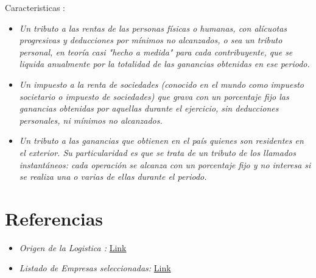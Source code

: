 \documentclass[
10pt, %
a4paper, %
oneside, %
headinclude,footinclude, %
BCOR5mm, %
]{scrartcl}
\begin{document}
Caracteristicas :
\begin{itemize}
  \item \emph{Un tributo a las rentas de las personas físicas o humanas, con
              alícuotas progresivas y deducciones por mínimos no alcanzados,
              o sea un tributo personal, en teoría casi "hecho a medida" para
              cada contribuyente, que se liquida anualmente por la totalidad
              de las ganancias obtenidas en ese periodo.}
  \item \emph{Un impuesto a la renta de sociedades (conocido en el mundo como
              impuesto societario o impuesto de sociedades) que grava con un
              porcentaje fijo las ganancias obtenidas por aquellas durante el
              ejercicio, sin deducciones personales, ni mínimos no alcanzados.}
  \item \emph{Un tributo a las ganancias que obtienen en el país quienes son
              residentes en el exterior. Su particularidad es que se trata de
              un tributo de los llamados instantáneos: cada operación se
              alcanza con un porcentaje fijo y no interesa si se realiza una o
              varias de ellas durante el periodo.}
\end{itemize}




\section{Referencias}

\begin{itemize}
  \item \textit{Origen de la Logistica :} \href{https://clusterlogistic.org/es/historia-de-la-logistica/} {Link}
  \item \textit{Listado de Empresas seleccionadas:} \href{https://servicios.transporte.gob.ar/gobierno_abierto/detalle.php?t=empresas&d=nacional} {Link}
\end{itemize}
\end{document}
